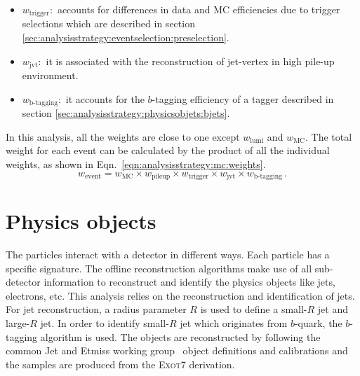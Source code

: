 \begin{itemize}
	\item $w_{\text{trigger}}:$ accounts for differences in data and MC efficiencies due to trigger selections which are described in section \ref{sec:analysisstrategy:eventselection:preselection}.
	
	\item $w_{\text{jvt}}:$ it is associated with the reconstruction of jet-vertex in high pile-up environment.
	
	\item $w_{\text{b-tagging}}:$ it accounts for the $b$-tagging efficiency of a tagger described in section \ref{sec:analysisstrategy:physicsobjets:bjets}.
\end{itemize}

In this analysis, all the weights are close to one except $w_{\text{lumi}}$ and $w_{\text{MC}}$. The total weight for each event can be calculated by the product of all the individual weights, as shown in Eqn.\ \ref{eqn:analysisstrategy:mc:weights}.
\begin{equation}
w_{\text{event}} = w_{\text{MC}} \times w_{\text{pileup}} \times w_{\text{trigger}} \times w_{\text{jvt}} \times w_{\text{b-tagging}} \,.
\label{eqn:analysisstrategy:mc:weights}
\end{equation}


\section{Physics objects}%
\label{sec:analysisstrategy:physicsobjets}
The particles interact with a detector in different ways. Each particle has a specific signature. The offline reconstruction algorithms make use of all sub-detector information to reconstruct and identify the physics objects like jets, electrons, etc. This analysis relies on the reconstruction and identification of jets. For jet reconstruction, a radius parameter $R$ is used to define a small-$R$ jet and large-$R$ jet. In order to identify small-$R$ jet which originates from $b$-quark, the $b$-tagging algorithm is used. The objects are reconstructed by following the common Jet and Etmiss working group~\cite{wtagger} object definitions and calibrations and the samples are produced from the \textsc{Exot7} derivation.


